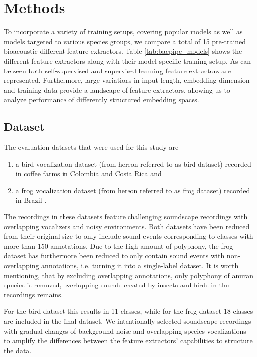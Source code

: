 \section{Methods}
\label{sec:methods}

To incorporate a variety of training setups, covering popular models as well as models targeted to various species groups, we compare a total of 15 pre-trained bioacoustic different feature extractors.
Table \ref{tab:bacpipe_models} shows the different feature extractors along with their model specific training setup. 
As can be seen both self-supervised and supervised learning feature extractors are represented. 
Furthermore, large variations in input length, embedding dimension and training data provide a landscape of feature extractors, allowing us to analyze performance of differently structured embedding spaces.

\subsection{Dataset}
\label{ssub:dataset}

The evaluation datasets that were used for this study are 
\begin{enumerate}
    \item a bird vocalization dataset (from hereon referred to as bird dataset) recorded in coffee farms in Colombia and Costa Rica \cite{vega-hidalgo_collection_2023} and
    \item a frog vocalization dataset (from hereon referred to as frog dataset) recorded in Brazil \cite{canas_dataset_2023}.
\end{enumerate}
The recordings in these datasets feature challenging soundscape recordings with overlapping vocalizers and noisy environments.
Both datasets have been reduced from their original size to only include sound events corresponding to classes with more than 150 annotations.
Due to the high amount of polyphony, the frog dataset has furthermore been reduced to only contain sound events with non-overlapping annotations, i.e. turning it into a single-label dataset.
It is worth mentioning, that by excluding overlapping annotations, only polyphony of anuran species is removed, overlapping sounds created by insects and birds in the recordings remains.

For the bird dataset this results in 11 classes, while for the frog dataset 18 classes are included in the final dataset.
We intentionally selected soundscape recordings with gradual changes of background noise and overlapping species vocalizations to amplify the differences between the feature extractors' capabilities to structure the data.


